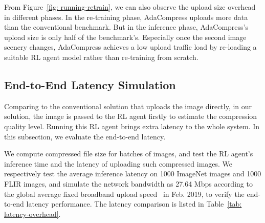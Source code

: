 From Figure~\ref{fig: running-retrain}, we can also observe the upload size overhead in different phases. In the re-training phase, AdaCompress uploads more data than the conventional benchmark. But in the inference phase, AdaCompress's upload size is only half of the benchmark's. Especially once the second image scenery changes, AdaCompress achieves a low upload traffic load by re-loading a suitable RL agent model rather than re-training from scratch. %

\subsection{End-to-End Latency Simulation}

Comparing to the conventional solution that uploads the image directly, in our solution, the image is passed to the RL agent firstly to estimate the compression quality level. Running this RL agent brings extra latency to the whole system. In this subsection, we evaluate the end-to-end latency. %

We compute compressed file size for batches of images, and test the RL agent's inference time and the latency of uploading such compressed images. \textcolor{revise}{We respectively test the average inference latency on 1000 ImageNet images and 1000 FLIR images}, and simulate the network bandwidth as 27.64 Mbps according to the global average fixed broadband upload speed~\cite{speedtest} in Feb. 2019, to verify the end-to-end latency performance. The latency comparison is listed in Table~\ref{tab: latency-overhead}. %


